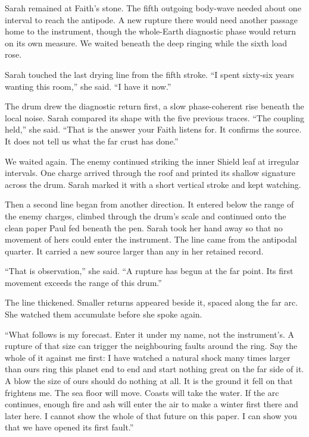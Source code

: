 Sarah remained at Faith's stone. The fifth outgoing body-wave needed about one interval to reach the antipode. A new rupture there would need another passage home to the instrument, though the whole-Earth diagnostic phase would return on its own measure. We waited beneath the deep ringing while the sixth load rose.\par

Sarah touched the last drying line from the fifth stroke. ``I spent sixty-six years wanting this room,'' she said. ``I have it now.''\par

The drum drew the diagnostic return first, a slow phase-coherent rise beneath the local noise. Sarah compared its shape with the five previous traces. ``The coupling held,'' she said. ``That is the answer your Faith listens for. It confirms the source. It does not tell us what the far crust has done.''\par

We waited again. The enemy continued striking the inner Shield leaf at irregular intervals. One charge arrived through the roof and printed its shallow signature across the drum. Sarah marked it with a short vertical stroke and kept watching.\par

Then a second line began from another direction. It entered below the range of the enemy charges, climbed through the drum's scale and continued onto the clean paper Paul fed beneath the pen. Sarah took her hand away so that no movement of hers could enter the instrument. The line came from the antipodal quarter. It carried a new source larger than any in her retained record.\par

``That is observation,'' she said. ``A rupture has begun at the far point. Its first movement exceeds the range of this drum.''\par

The line thickened. Smaller returns appeared beside it, spaced along the far arc. She watched them accumulate before she spoke again.\par

``What follows is my forecast. Enter it under my name, not the instrument's. A rupture of that size can trigger the neighbouring faults around the ring. Say the whole of it against me first: I have watched a natural shock many times larger than ours ring this planet end to end and start nothing great on the far side of it. A blow the size of ours should do nothing at all. It is the ground it fell on that frightens me. The sea floor will move. Coasts will take the water. If the arc continues, enough fire and ash will enter the air to make a winter first there and later here. I cannot show the whole of that future on this paper. I can show you that we have opened its first fault.''\par


